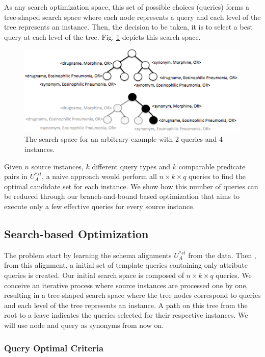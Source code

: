 As any search optimization space, this set of possible choices (queries) forms a tree-shaped search space where each node represents a query and each level of the tree represents an instance. Then, the decision to be taken, it is to select a best query at each level of the tree. Fig. \ref{fig:sspace} depicts this search space.

 \begin{figure} [h]
\vspace{-10pt}
\centering
\includegraphics[scale=0.45]{p22.png}
\caption{The search space for an arbitrary example with 2 queries and 4 instances.} 
\vspace{-10pt}
\label{fig:sspace}
\end{figure}

Given $n$ source instances, $k$ different query types and $k$ comparable predicate pairs in $U^{*st}_A$, a naive approach would perform all $n \times k \times q$ queries to find the optimal candidate set for each instance. We show how this number of queries can be reduced through our branch-and-bound based optimization that aims to execute only a few effective queries for every source instance. 
 
\subsection{Search-based Optimization} 
The problem start by learning the schema alignments $U^{*st}_A$ from the data. Then , from this alignment, a initial set of template queries containing only attribute queries is created. Our initial search space is composed of $n \times k \times q$ queries. We conceive an iterative process where source instances are processed one by one, resulting in a tree-shaped search space where the tree nodes correspond to queries and each level of the tree represents an instance.  A path on this tree from the root to a leave indicates the queries selected for their respective instances. We will use node and query as synonyms from now on.

\subsubsection{Query Optimal Criteria} 


